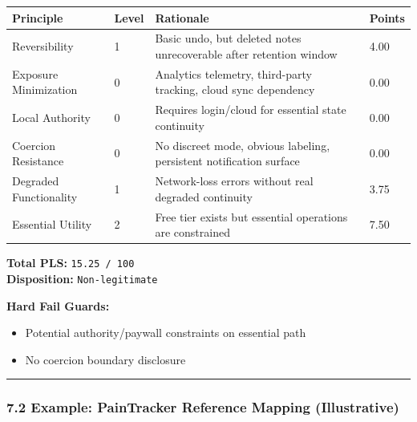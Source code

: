 \documentclass[
]{article}
\newcounter{none} %
\providecommand{\tightlist}{%
  \setlength{\itemsep}{0pt}\setlength{\parskip}{0pt}}
\begin{document}
{\def\LTcaptype{none} %
\begin{longtable}[]{@{}llll@{}}
\toprule\noalign{}
Principle & Level & Rationale & Points \\
\midrule\noalign{}
\endhead
\bottomrule\noalign{}
\endlastfoot
Reversibility & 1 & Basic undo, but deleted notes unrecoverable after
retention window & 4.00 \\
Exposure Minimization & 0 & Analytics telemetry, third-party tracking,
cloud sync dependency & 0.00 \\
Local Authority & 0 & Requires login/cloud for essential state
continuity & 0.00 \\
Coercion Resistance & 0 & No discreet mode, obvious labeling, persistent
notification surface & 0.00 \\
Degraded Functionality & 1 & Network-loss errors without real degraded
continuity & 3.75 \\
Essential Utility & 2 & Free tier exists but essential operations are
constrained & 7.50 \\
\end{longtable}
}

\textbf{Total PLS:} \texttt{15.25\ /\ 100}\\
\textbf{Disposition:} \texttt{Non-legitimate}

\textbf{Hard Fail Guards:}

\begin{itemize}
\tightlist
\item
  Potential authority/paywall constraints on essential path
\item
  No coercion boundary disclosure
\end{itemize}

\begin{center}\rule{0.5\linewidth}{0.5pt}\end{center}

\subsubsection{7.2 Example: PainTracker Reference Mapping
(Illustrative)}\label{72-example-paintracker-reference-mapping-illustrative}
\end{document}
